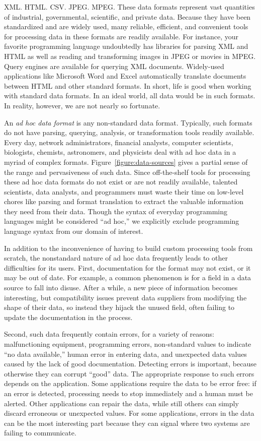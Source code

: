 XML. HTML. CSV. JPEG. MPEG.  These data formats
represent vast quantities of industrial, governmental,
scientific, and private data.  Because they have been standardized
and are widely used, many reliable, efficient, and
convenient tools for processing data in these formats are
readily available.  For instance, your favorite programming language
undoubtedly has libraries for parsing XML and HTML as well as
reading and transforming images in JPEG or movies in MPEG.  Query engines
are available for querying XML documents.
Widely-used applications like Microsoft Word and Excel automatically
translate documents between HTML and other
standard formats.  In short, life is good when working with standard data formats. In an ideal world, all data would be in such formats. In reality, however, we are not nearly so fortunate.

An {\em ad hoc data format} is any non-standard data format.  
Typically, such formats do not have parsing,
querying, analysis, or transformation tools readily available.
Every day, network administrators, financial analysts, computer
scientists, biologists, 
chemists, astronomers, and
physicists deal with ad hoc data in a myriad of complex formats.
Figure~\ref{figure:data-sources} gives a partial sense of the range
and pervasiveness of such data.  Since off-the-shelf
tools for processing these ad hoc data formats do not exist
or are not readily available, talented scientists, data analysts, and
programmers must waste their time 
on low-level chores like parsing and format translation
to extract the valuable information they need from their data.
Though the syntax of everyday programming languages
might be considered ``ad hoc,'' we explicitly exclude
programming language syntax from our domain of interest.

In addition to the inconvenience of having to build custom
processing tools from scratch, the nonstandard nature of ad hoc data
frequently leads to other difficulties for its users.
First, documentation for the format may not exist, or it may be out of
date.  For example, a common phenomenon is for a field in a data source to fall
into disuse.  After a while, a new piece of information becomes
interesting, but compatibility issues prevent data suppliers from
modifying the shape of their data, so instead they hijack the unused
field, often failing to update the documentation in the process.

Second, such data frequently contain errors, for a variety of reasons:
malfunctioning equipment, programming errors, non-standard values to
indicate ``no data available,'' human error in entering data, and
unexpected data values caused by the lack of good documentation.
Detecting errors is important, because otherwise they can corrupt
``good'' data.  The appropriate response to such errors depends on the
application. Some applications require the data to be error free: if
an error is detected, processing needs to stop immediately and a human
must be alerted.  Other applications can repair the data, while still
others can simply discard erroneous or unexpected values.  For some
applications, errors in the data can be the most interesting part
because they can signal where two systems are failing to communicate.

